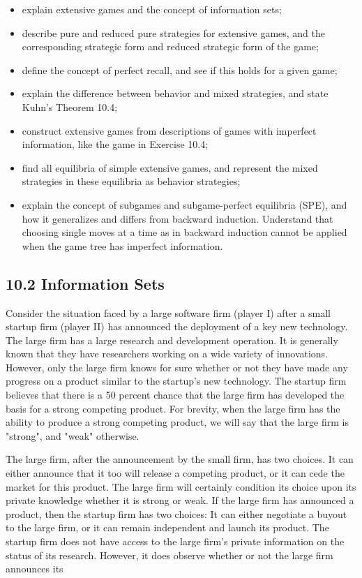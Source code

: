 \documentclass[12pt]{article}
\begin{document}
\begin{itemize}
  \item explain extensive games and the concept of information sets;
  \item describe pure and reduced pure strategies for extensive games, and the corresponding strategic form and reduced strategic form of the game;
  \item define the concept of perfect recall, and see if this holds for a given game;
  \item explain the difference between behavior and mixed strategies, and state Kuhn's Theorem 10.4;
  \item construct extensive games from descriptions of games with imperfect information, like the game in Exercise 10.4;
  \item find all equilibria of simple extensive games, and represent the mixed strategies in these equilibria as behavior strategies;
  \item explain the concept of subgames and subgame-perfect equilibria (SPE), and how it generalizes and differs from backward induction. Understand that choosing single moves at a time as in backward induction cannot be applied when the game tree has imperfect information.
\end{itemize}

\subsection*{10.2 Information Sets}
Consider the situation faced by a large software firm (player I) after a small startup firm (player II) has announced the deployment of a key new technology. The large firm has a large research and development operation. It is generally known that they have researchers working on a wide variety of innovations. However, only the large firm knows for sure whether or not they have made any progress on a product similar to the startup's new technology. The startup firm believes that there is a 50 percent chance that the large firm has developed the basis for a strong competing product. For brevity, when the large firm has the ability to produce a strong competing product, we will say that the large firm is "strong", and "weak" otherwise.

The large firm, after the announcement by the small firm, has two choices. It can either announce that it too will release a competing product, or it can cede the market for this product. The large firm will certainly condition its choice upon its private knowledge whether it is strong or weak. If the large firm has announced a product, then the startup firm has two choices: It can either negotiate a buyout to the large firm, or it can remain independent and launch its product. The startup firm does not have access to the large firm's private information on the status of its research. However, it does observe whether or not the large firm announces its
\end{document}
